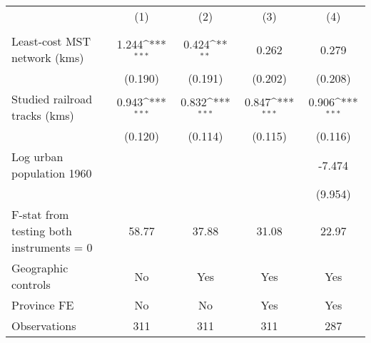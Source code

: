 {
\def\sym#1{\ifmmode^{#1}\else\(^{#1}\)\fi}
\begin{tabular}{l*{4}{c}}
\hline\hline
                &\multicolumn{1}{c}{(1)}&\multicolumn{1}{c}{(2)}&\multicolumn{1}{c}{(3)}&\multicolumn{1}{c}{(4)}\\
                &\multicolumn{1}{c}{}&\multicolumn{1}{c}{}&\multicolumn{1}{c}{}&\multicolumn{1}{c}{}\\
\hline
Least-cost MST network (kms)&    1.244\sym{***}&    0.424\sym{**} &    0.262         &    0.279         \\
                &  (0.190)         &  (0.191)         &  (0.202)         &  (0.208)         \\
[1em]
Studied railroad tracks (kms)&    0.943\sym{***}&    0.832\sym{***}&    0.847\sym{***}&    0.906\sym{***}\\
                &  (0.120)         &  (0.114)         &  (0.115)         &  (0.116)         \\
[1em]
Log urban population 1960&                  &                  &                  &   -7.474         \\
                &                  &                  &                  &  (9.954)         \\
\hline
F-stat from testing both instruments = 0&    58.77         &    37.88         &    31.08         &    22.97         \\
Geographic controls&       No         &      Yes         &      Yes         &      Yes         \\
Province FE     &       No         &       No         &      Yes         &      Yes         \\
Observations    &      311         &      311         &      311         &      287         \\
\hline\hline
\end{tabular}
}
